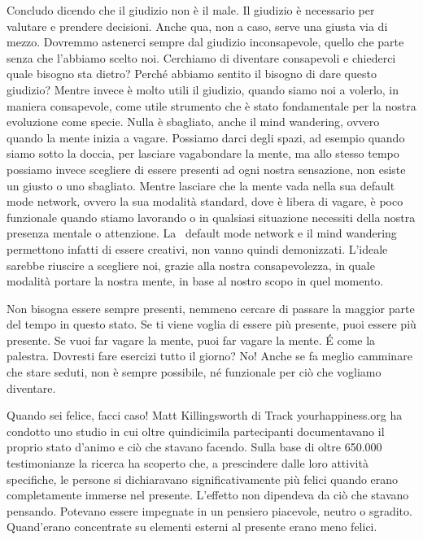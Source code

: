 \documentclass[12pt]{book} %
\begin{document}
Concludo dicendo che il giudizio non è il male. Il giudizio è necessario per valutare e prendere decisioni. Anche qua,
non a caso, serve una giusta via di mezzo. Dovremmo astenerci sempre dal giudizio inconsapevole, quello che parte senza
che l'abbiamo scelto noi. Cerchiamo di diventare consapevoli e chiederci quale bisogno sta dietro?
Perché abbiamo sentito il bisogno di dare questo giudizio? Mentre invece è molto utili il giudizio, quando siamo noi a
volerlo, in maniera consapevole, come utile strumento che è stato fondamentale per la nostra evoluzione come specie.
Nulla è sbagliato, anche il mind wandering, ovvero quando la mente inizia a vagare. Possiamo darci degli spazi, ad
esempio quando siamo sotto la doccia, per lasciare vagabondare la mente, ma allo stesso tempo possiamo invece scegliere
di essere presenti ad ogni nostra sensazione, non esiste un giusto o uno sbagliato. Mentre lasciare che la mente vada
nella sua default mode network, ovvero la sua modalità standard, dove è libera di vagare, è poco funzionale quando
stiamo lavorando o in qualsiasi situazione necessiti della nostra presenza mentale o attenzione. La \ default mode
network e il mind wandering permettono infatti di essere creativi, non vanno quindi
demonizzati.
L'ideale sarebbe riuscire a scegliere noi, grazie alla nostra consapevolezza, in quale modalità
portare la nostra mente, in base al nostro scopo in quel momento.

Non bisogna essere sempre presenti, nemmeno cercare di passare la maggior parte del tempo in questo stato. Se ti viene
voglia di essere più presente, puoi essere più presente. Se vuoi far vagare la mente, puoi far vagare la mente. É come
la palestra. Dovresti fare esercizi tutto il giorno? No! Anche se fa meglio camminare che stare seduti, non è sempre
possibile, né funzionale per ciò che vogliamo diventare.

Quando sei felice, facci caso!
Matt Killingsworth di Track yourhappiness.org ha condotto uno studio in cui oltre quindicimila partecipanti
documentavano il proprio stato d'animo e ciò che stavano facendo. Sulla base di oltre 650.000
testimonianze la ricerca ha scoperto che, a prescindere dalle loro attività specifiche, le persone si dichiaravano
significativamente più felici quando erano completamente immerse nel presente. L'effetto non
dipendeva da ciò che stavano pensando. Potevano essere impegnate in un pensiero piacevole, neutro o sgradito.
Quand'erano concentrate su elementi esterni al presente erano meno felici. 
\end{document}
